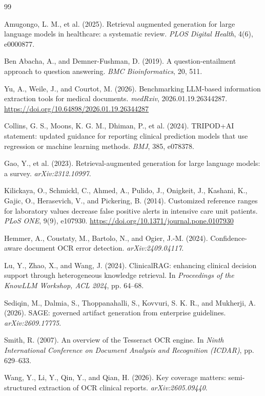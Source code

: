 \documentclass[11pt]{article}
\begin{document}
\begin{thebibliography}{99}
\small

Amugongo, L. M., et al. (2025).
Retrieval augmented generation for large language models in healthcare: a systematic review.
\emph{PLOS Digital Health}, 4(6), e0000877.

Ben Abacha, A., and Demner-Fushman, D. (2019).
A question-entailment approach to question answering.
\emph{BMC Bioinformatics}, 20, 511.

Yu, A., Weile, J., and Courtot, M. (2026).
Benchmarking LLM-based information extraction tools for medical documents.
\emph{medRxiv}, 2026.01.19.26344287.
\url{https://doi.org/10.64898/2026.01.19.26344287}

Collins, G. S., Moons, K. G. M., Dhiman, P., et al. (2024).
TRIPOD+AI statement: updated guidance for reporting clinical prediction models that use
regression or machine learning methods.
\emph{BMJ}, 385, e078378.

Gao, Y., et al. (2023).
Retrieval-augmented generation for large language models: a survey.
\emph{arXiv:2312.10997}.

Kilickaya, O., Schmickl, C., Ahmed, A., Pulido, J., Onigkeit, J., Kashani, K., Gajic, O.,
Herasevich, V., and Pickering, B. (2014).
Customized reference ranges for laboratory values decrease false positive alerts in intensive
care unit patients.
\emph{PLoS ONE}, 9(9), e107930. \url{https://doi.org/10.1371/journal.pone.0107930}

Hemmer, A., Coustaty, M., Bartolo, N., and Ogier, J.-M. (2024).
Confidence-aware document OCR error detection.
\emph{arXiv:2409.04117}.

Lu, Y., Zhao, X., and Wang, J. (2024).
ClinicalRAG: enhancing clinical decision support through heterogeneous knowledge retrieval.
In \emph{Proceedings of the KnowLLM Workshop, ACL 2024}, pp. 64--68.

Sediqin, M., Dalmia, S., Thoppanahalli, S., Kovvuri, S. K. R., and Mukherji, A. (2026).
SAGE: governed artifact generation from enterprise guidelines.
\emph{arXiv:2609.17775}.

Smith, R. (2007).
An overview of the Tesseract OCR engine.
In \emph{Ninth International Conference on Document Analysis and Recognition (ICDAR)},
pp. 629--633.

Wang, Y., Li, Y., Qin, Y., and Qian, H. (2026).
Key coverage matters: semi-structured extraction of OCR clinical reports.
\emph{arXiv:2605.09440}.

\end{thebibliography}
\end{document}
